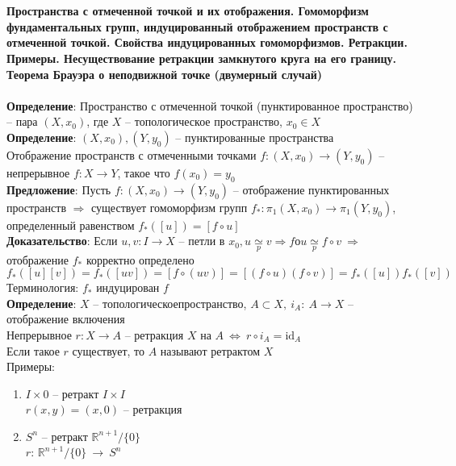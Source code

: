 	\section{}
	\textbf{Пространства с отмеченной точкой и их отображения. Гомоморфизм фундаментальных групп, индуцированный отображением пространств с отмеченной точкой. Свойства индуцированных гомоморфизмов. Ретракции. Примеры. Несуществование ретракции замкнутого круга на его границу. Теорема Брауэра о неподвижной точке (двумерный случай)}\\
	\\
	\textbf{Определение}: Пространство с отмеченной точкой (пунктированное пространство) -- пара $(X, x_0)$, где $X$ -- топологическое пространство, $x_0 \in X$\\
	\textbf{Определение}: $(X, x_0), (Y, y_0)$ -- пунктированные пространства\\
	Отображение пространств с отмеченными точками $f: (X, x_0) \rightarrow (Y, y_0)$ -- непрерывное $f: X \rightarrow Y$, такое что $f(x_0) = y_0$\\
	\textbf{Предложение}: Пусть $f: (X, x_0) \rightarrow (Y, y_0)$ -- отображение пунктированных пространств $\Rightarrow$ существует гомоморфизм групп $f_*: \pi_1 (X,x_0) \rightarrow \pi_1 (Y,y_0)$, определенный равенством $f_*([u]) = [f \circ u]$\\
	\textbf{Доказательство}: Если $u, v: I \rightarrow X$ -- петли в $x_0, u \underset{p}{\simeq} v \Rightarrow fоu \underset{p}{\simeq} f \circ v\ \Rightarrow$ отображение $f_*$ корректно определено\\
	$f_*([u][v]) = f_*([uv]) = [f \circ (uv)] = [(f \circ u)(f \circ v)] = f_*([u])f_*([v])$\\
	Терминология: $f_*$ индуцирован $f$\\
	\textbf{Определение}: $X$ -- топологическоепространство, $A \subset X,\ i_A:\ A \rightarrow X$ -- отображение включения\\
	Непрерывное $r: X \rightarrow A$ -- ретракция $X$ на $A\ \Leftrightarrow\ r \circ i_A =  \text{id}_A$\\
	Если такое $r$ существует, то $A$ называют ретрактом $X$\\
	Примеры:
	\begin{enumerate}
		\item $I\times {0}$ -- ретракт $I\times I$\\
		$r(x,y) = (x,0)$ -- ретракция
		\item ${S}^n$ -- ретракт $\mathbb{R}^{n+1}\slash\{0\}$\\
		$r$: $\mathbb{R}^{n+1}\slash \{0\}\ \rightarrow\ {S}^n$
	\end{enumerate} 
